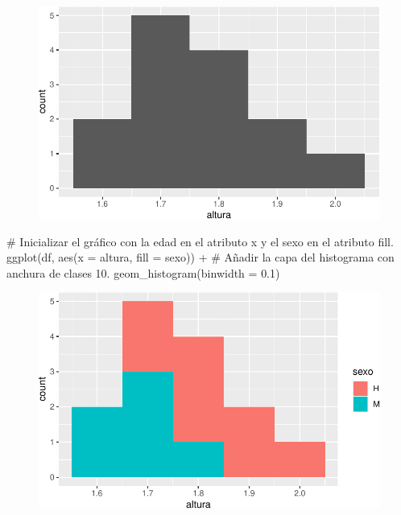 \documentclass[
  a4paper,
]{scrreport}
\newenvironment{Shaded}{\begin{snugshade}}{\end{snugshade}}
\newcommand{\AttributeTok}[1]{\textcolor[rgb]{0.40,0.45,0.13}{#1}}
\newcommand{\CommentTok}[1]{\textcolor[rgb]{0.37,0.37,0.37}{#1}}
\newcommand{\FloatTok}[1]{\textcolor[rgb]{0.68,0.00,0.00}{#1}}
\newcommand{\FunctionTok}[1]{\textcolor[rgb]{0.28,0.35,0.67}{#1}}
\newcommand{\NormalTok}[1]{\textcolor[rgb]{0.00,0.23,0.31}{#1}}
\newcommand{\SpecialCharTok}[1]{\textcolor[rgb]{0.37,0.37,0.37}{#1}}
\theoremstyle{definition}
\theoremstyle{definition}
\theoremstyle{remark}
\begin{document}
\begin{figure}[H]

{\centering \includegraphics{07-graficos_files/figure-pdf/unnamed-chunk-16-1.pdf}

}

\end{figure}

\begin{Shaded}
\begin{Highlighting}[]
\CommentTok{\# Inicializar el gráfico con la edad en el atributo x y el sexo en el atributo fill.}
\FunctionTok{ggplot}\NormalTok{(df, }\FunctionTok{aes}\NormalTok{(}\AttributeTok{x =}\NormalTok{ altura, }\AttributeTok{fill =}\NormalTok{ sexo)) }\SpecialCharTok{+}
\CommentTok{\# Añadir la capa del histograma con anchura de clases 10.}
    \FunctionTok{geom\_histogram}\NormalTok{(}\AttributeTok{binwidth =} \FloatTok{0.1}\NormalTok{)}
\end{Highlighting}
\end{Shaded}

\begin{figure}[H]

{\centering \includegraphics{07-graficos_files/figure-pdf/unnamed-chunk-17-1.pdf}

}

\end{figure}
\end{document}
